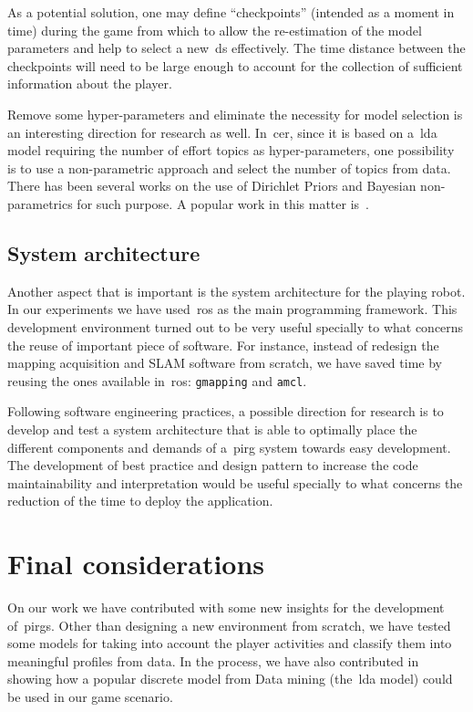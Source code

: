 As a potential solution, one may define ``checkpoints'' (intended as a moment in time) during the game from which to allow the re-estimation of the model parameters and help to select a new~\gls{ds} effectively. The time distance between the checkpoints will need to be large enough to account for the collection of sufficient information about the player.

Remove some hyper-parameters and eliminate the necessity for model selection is an interesting direction for research as well. In~\gls{cer}, since it is based on a~\gls{lda} model requiring the number of effort topics as hyper-parameters, one possibility is to use a non-parametric approach and select the number of topics from data. There has been several works on the use of Dirichlet Priors and Bayesian non-parametrics for such purpose. A popular work in this matter is~\cite{teh_sharing_2005}. 

\subsection{System architecture}
Another aspect that is important is the system architecture for the playing robot. In our experiments we have used~\gls{ros} as the main programming framework. This development environment turned out to be very useful specially to what concerns the reuse of important piece of software. For instance, instead of redesign the  mapping acquisition and SLAM software from scratch, we have saved time by reusing the ones available in~\gls{ros}: \verb|gmapping| and \verb|amcl|. 

Following software engineering practices, a possible direction for research is to develop and test a system architecture that is able to optimally place the different components and demands of a~\gls{pirg} system towards easy development. The development of best practice and design pattern to increase the code maintainability and interpretation would be useful specially to what concerns the reduction of the time to deploy the application.

\section{Final considerations}
On our work we have contributed with some new insights for the development of~\gls{pirg}s. Other than designing a new environment from scratch, we have tested some models for taking into account the player activities and classify them into meaningful profiles from data. In the process, we have also contributed in showing how a popular discrete model from Data mining (the~\gls{lda} model) could be used in our game scenario. 


